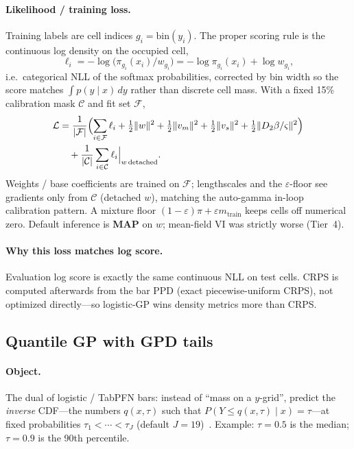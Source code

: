 \documentclass[11pt,a4paper]{article}
\theoremstyle{definition}
\begin{document}
\paragraph{Likelihood / training loss.}
Training labels are cell indices $g_i=\mathrm{bin}(y_i)$. The proper scoring
rule is the continuous log density on the occupied cell,
\begin{equation}
  \ell_i
  =
  -\log\bigl(\pi_{g_i}(x_i)/w_{g_i}\bigr)
  =
  -\log\pi_{g_i}(x_i)+\log w_{g_i},
\end{equation}
i.e.\ categorical NLL of the softmax probabilities, corrected by bin width so
the score matches $\int p(y\mid x)\,dy$ rather than discrete cell mass.
With a fixed 15\% calibration mask $\mathcal{C}$ and fit set $\mathcal{F}$,
\begin{align}
  \mathcal{L}
  &=
  \frac{1}{|\mathcal{F}|}
  \Bigl(
    \sum_{i\in\mathcal{F}}\ell_i
    +
    \tfrac12\|w\|^2
    +
    \tfrac12\|v_m\|^2
    +
    \tfrac12\|v_s\|^2
    +
    \tfrac12\|D_2\beta/\varsigma\|^2
  \Bigr)
  \nonumber\\
  &\quad
  +
  \frac{1}{|\mathcal{C}|}\sum_{i\in\mathcal{C}}\ell_i\Big|_{w\,\mathrm{detached}}.
\end{align}
Weights / base coefficients are trained on $\mathcal{F}$; lengthscales and the
$\varepsilon$-floor see gradients only from $\mathcal{C}$ (detached $w$),
matching the auto-gamma in-loop calibration pattern. A mixture floor
$(1-\varepsilon)\pi+\varepsilon m_{\mathrm{train}}$ keeps cells off numerical
zero. Default inference is \textbf{MAP} on $w$; mean-field VI was strictly
worse (Tier~4).

\paragraph{Why this loss matches log score.}
Evaluation log score is exactly the same continuous NLL on test cells.
CRPS is computed afterwards from the bar PPD (exact piecewise-uniform CRPS),
not optimized directly---so logistic-GP wins density metrics more than CRPS.

\subsection{Quantile GP with GPD tails}
\label{sec:quantile}

\paragraph{Object.}
The dual of logistic / TabPFN bars: instead of ``mass on a $y$-grid'', predict
the \emph{inverse} CDF---the numbers $q(x,\tau)$ such that
$P(Y\le q(x,\tau)\mid x)=\tau$---at fixed probabilities
$\tau_1<\cdots<\tau_J$ (default $J{=}19$)~\cite{abeywardana2015}.
Example: $\tau{=}0.5$ is the median; $\tau{=}0.9$ is the 90th percentile.
\end{document}

